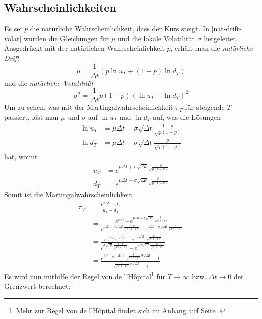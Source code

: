 \documentclass[11pt]{report} %
\begin{document}
\subsection{Wahrscheinlichkeiten}
Es sei $p$ die natürliche Wahrscheinlichkeit, dass der Kurs steigt. In \ref{nat-drift-volat} wurden die Gleichungen für $\mu$ und die lokale Volatilität $\sigma$ hergeleitet. Ausgedrückt mit der natürlichen Wahrscheinlichkeit $p$, erhält man die \textit{natürliche Drift} $$\mu=\frac{1}{\Delta t}(p\ln{u_T}+(1-p)\ln{d_T})$$ und die \textit{natürliche Volatilität} $$\sigma^2=\frac{1}{\Delta t}p(1-p)(\ln{u_T}-\ln{d_T})^2$$Um zu sehen, was mit der Martingalwahrscheinlichkeit $\pi_T$ für steigende $T$ passiert, löst man $\mu$ und $\sigma$ auf $\ln{u_T}$ und $\ln{d_T}$ auf, was die Lösungen
\begin{align*}
    \ln{u_T}&=\mu\Delta t +\sigma\sqrt{\Delta t}\frac{1-p}{\sqrt{p(1-p)}}\\
    \ln{d_T}&=\mu\Delta t - \sigma\sqrt{\Delta t}\frac{p}{\sqrt{p(1-p)}}
\end{align*}
hat, womit
\begin{align*}
    u_T&=e^{\mu\Delta t +\sigma\sqrt{\Delta t}\frac{1-p}{\sqrt{p(1-p)}}}\\
    d_T&=e^{\mu\Delta t - \sigma\sqrt{\Delta t}\frac{p}{\sqrt{p(1-p)}}}
\end{align*}
Somit ist die Martingalwahrscheinlichkeit
\begin{align*}
    \pi_T&=\frac{e^{r\Delta t}-d_T}{u_T-d_T}\\
    &=\frac{e^{r\Delta t}-e^{\mu\Delta t - \sigma\sqrt{\Delta t}\frac{p}{\sqrt{p(1-p)}}}}{e^{\mu\Delta t +\sigma\sqrt{\Delta t}\frac{1-p}{\sqrt{p(1-p)}}}-e^{\mu\Delta t - \sigma\sqrt{\Delta t}\frac{p}{\sqrt{p(1-p)}}}}\\
    &=\frac{e^{(r-\mu)\Delta t}-e^{-\sigma\sqrt{\Delta t}\frac{p}{\sqrt{p(1-p)}}}}{e^{\sigma\sqrt{\Delta t}\frac{1-p}{\sqrt{p(1-p)}}}-e^{-\sigma\sqrt{\Delta t}\frac{p}{\sqrt{p(1-p)}}}}\\
    &=\frac{e^{(r-\mu)\Delta t+\frac{p}{\sqrt{p(1-p)}}\sigma\sqrt{\Delta t}}-1}{e^{\frac{1}{\sqrt{p(1-p)}}\sigma\sqrt{\Delta t}}-1}
\end{align*}
Es  wird nun mithilfe der Regel von de l'Hôpital\footnote{Mehr zur Regel von de l'Hôpital findet sich im Anhang auf Seite \pageref{th:delhopital-rule}.} für $T\rightarrow\infty$ bzw. $\Delta t \rightarrow 0$ der Grenzwert berechnet:
\end{document}

